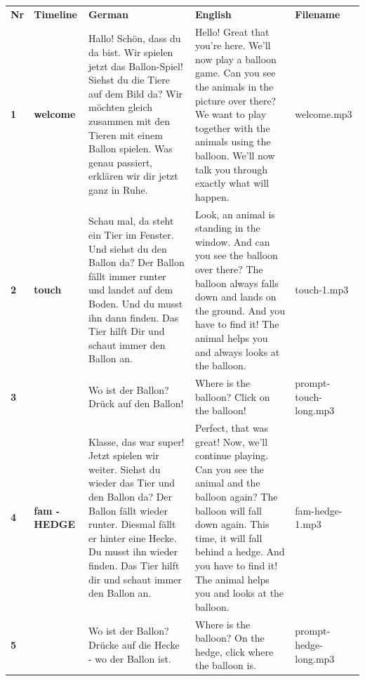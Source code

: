 \documentclass[
  english,
  man,floatsintext]{apa6}
\begin{document}
\begin{longtable}[]{@{}
  >{\raggedright\arraybackslash}p{}
  >{\raggedright\arraybackslash}p{}
  >{\raggedright\arraybackslash}p{}
  >{\raggedright\arraybackslash}p{}
  >{\raggedright\arraybackslash}p{}@{}}
\toprule
\endhead
\textbf{Nr} & \textbf{Timeline} & \textbf{German} & \textbf{English} & \textbf{Filename} \\
\textbf{1} & \textbf{welcome} & Hallo! Schön, dass du da bist. Wir spielen jetzt das Ballon-Spiel! Siehst du die Tiere auf dem Bild da? Wir möchten gleich zusammen mit den Tieren mit einem Ballon spielen. Was genau passiert, erklären wir dir jetzt ganz in Ruhe. & Hello! Great that you're here. We'll now play a balloon game. Can you see the animals in the picture over there? We want to play together with the animals using the balloon. We'll now talk you through exactly what will happen. & welcome.mp3 \\
\textbf{2} & \textbf{touch} & Schau mal, da steht ein Tier im Fenster. Und siehst du den Ballon da? Der Ballon fällt immer runter und landet auf dem Boden. Und du musst ihn dann finden. Das Tier hilft Dir und schaut immer den Ballon an. & Look, an animal is standing in the window. And can you see the balloon over there? The balloon always falls down and lands on the ground. And you have to find it! The animal helps you and always looks at the balloon. & touch-1.mp3 \\
\textbf{3} & & Wo ist der Ballon? Drück auf den Ballon! & Where is the balloon? Click on the balloon! & prompt-touch-long.mp3 \\
\textbf{4} & \textbf{fam - HEDGE} & Klasse, das war super! Jetzt spielen wir weiter. Siehst du wieder das Tier und den Ballon da? Der Ballon fällt wieder runter. Diesmal fällt er hinter eine Hecke. Du musst ihn wieder finden. Das Tier hilft dir und schaut immer den Ballon an. & Perfect, that was great! Now, we'll continue playing. Can you see the animal and the balloon again? The balloon will fall down again. This time, it will fall behind a hedge. And you have to find it! The animal helps you and looks at the balloon. & fam-hedge-1.mp3 \\
\textbf{5} & & Wo ist der Ballon? Drücke auf die Hecke - wo der Ballon ist. & Where is the balloon? On the hedge, click where the balloon is. & prompt-hedge-long.mp3 \\

\end{longtable}
\end{document}
